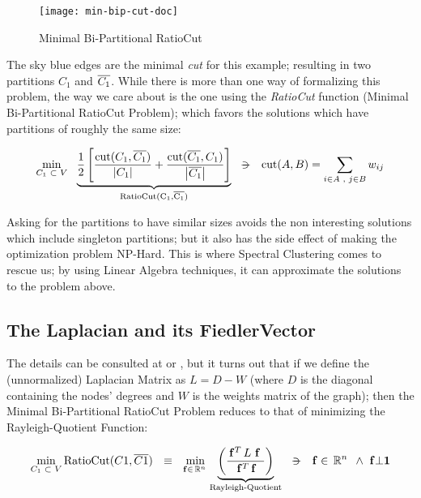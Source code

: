 \begin{figure}[H]
  \label{min-bip-cut}
  \centering
  \caption{Minimal Bi-Partitional RatioCut}  
  \texttt{[image: min-bip-cut-doc]}
\end{figure}

The sky blue edges are the minimal \emph{cut} for this example; resulting
in two partitions $C_1$ and $\overline{C_1}$. While there is more than
one way of formalizing this problem, the way we care about is the one
using the \emph{RatioCut} function (Minimal Bi-Partitional RatioCut Problem);
which favors the solutions which have partitions of roughly
the same size: 

\begin{equation*}
  \min\limits_{\tiny{C_1 \ds{\subset} V}} \ds{}
  \underbrace{      
    \frac{1}{2}
    \left[
      \dfrac{\func{cut}(C_1,\stcomp{C_1})}{\abs{C_1}} +
      \dfrac{\func{cut}(\stcomp{C_1},C_1)}{\abs{\stcomp{C_1}}}
      \right]
  }_{\func{RatioCut(C_1,\stcomp{C_1})}}
  \ds{\suchthat}
  \func{cut}(A,B) = \sum\limits_{\tiny{i \in A \ds{,} j \in B}} w_{ij}
\end{equation*}
\joinbelow{1cm}

Asking for the partitions to have similar sizes avoids the non
interesting solutions which include singleton partitions; but it also
has the side effect of making the optimization problem NP-Hard. This
is where Spectral Clustering comes to rescue us; by using Linear
Algebra techniques, it can approximate the solutions to the problem
above.

\subsection{The \gls{Laplacian} and its \gls{FiedlerVector}}
The details can be consulted at \cite{luxburg07} or
\cite{gao13}, but it turns out that if we define the (unnormalized)
\gls{Laplacian} Matrix as $L = D - W$ (where $D$ is the diagonal containing
the nodes' degrees and $W$ is the weights matrix of the graph); then
the Minimal Bi-Partitional RatioCut Problem reduces to that of minimizing the
Rayleigh-Quotient Function:

\begin{equation*}
\min\limits_{C_1 \ds{\subset} V} \func{RatioCut}(C1,\stcomp{C1})
\ds{\ds{\equiv}}
\min\limits_{\vec{f} \in \R{n}}
  \underbrace{
    \left(\dfrac{\trans{\vec{f}} L \ds{\vec{f}}}{\trans{\vec{f}} \vec{f}}\right)
  }_{\text{Rayleigh-Quotient}}    
\ds{\suchthat}
\vec{f} \in \R{n} \ds{\land} \vec{f} \bot \vec{1}
\end{equation*}
\joinbelow{1cm}

